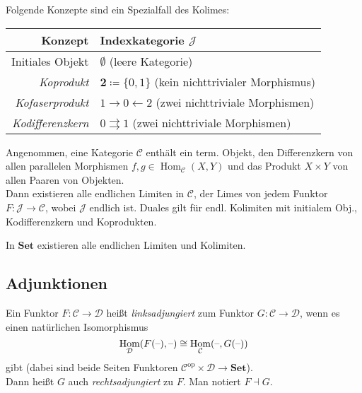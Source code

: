 \documentclass{cheat-sheet}
\newcommand{\SetC}{\mathbf{Set}} %
\newcommand{\op}{\mathrm{op}} %
\DeclareMathOperator{\Hom}{Hom} %
\newcommand{\Cat}{\mathcal{C}} %
\newcommand{\Dat}{\mathcal{D}} %
\newcommand{\Jat}{\mathcal{J}} %
\newcommand{\ladj}{\dashv} %
\begin{document}
\begin{bem}
  Folgende Konzepte sind ein Spezialfall des Kolimes:
  \begin{center}
    \begin{tabular}{ | r | l | }
      \hline
      Konzept & Indexkategorie $\Jat$ \\ \hline
      Initiales Objekt & $\emptyset$ (leere Kategorie) \\
      \emph{Koprodukt} & $\mathbf{2} \coloneqq \{ 0, 1 \}$ (kein nichttrivialer Morphismus) \\
      \emph{Kofaserprodukt} & $1 \to 0 \leftarrow 2$ (zwei nichttriviale Morphismen) \\
      \emph{Kodifferenzkern} &  $0 \rightrightarrows 1$ (zwei nichttriviale Morphismen) \\ \hline
    \end{tabular}
  \end{center}
\end{bem}

\begin{satz}
  Angenommen, eine Kategorie $\Cat$ enthält ein term. Objekt, den Differenzkern von allen parallelen Morphismen $f, g \in \Hom_\Cat(X, Y)$ und das Produkt $X \times Y$ von allen Paaren von Objekten. \\
  Dann existieren alle endlichen Limiten in $\Cat$, \dh{} der Limes von jedem Funktor $F : \Jat \to \Cat$, wobei $\Jat$ endlich ist.
  Duales gilt für endl. Kolimiten mit initialem Obj., Kodifferenzkern und Koprodukten.
\end{satz}

\begin{kor}
  In $\SetC$ existieren alle endlichen Limiten und Kolimiten.
\end{kor}


\subsection{Adjunktionen}

\begin{defn}
  Ein Funktor $F : \Cat \to \Dat$ heißt \emph{linksadjungiert} zum Funktor $G : \Cat \to \Dat$, wenn es einen natürlichen Isomorphismus
  \[
    \Hom_\Dat(F(\blank), \blank) \cong \Hom_\Cat(\blank, G(\blank))
  \]
  gibt (dabei sind beide Seiten Funktoren $\Cat^\op \times \Dat \to \SetC$). \\
  Dann heißt $G$ auch \emph{rechtsadjungiert} zu $F$. Man notiert $F \ladj G$.
\end{defn}
\end{document}

